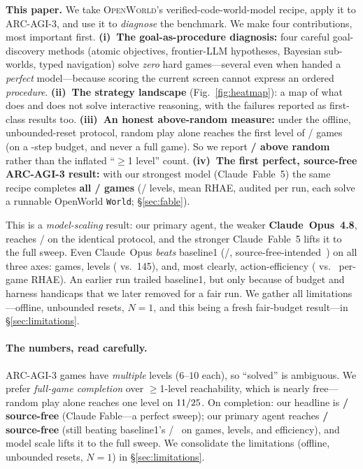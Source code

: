 \documentclass[11pt]{article}
\newcommand{\openworld}{\textsc{OpenWorld}}
\begin{document}
\textbf{This paper.} We take \openworld{}'s verified-code-world-model recipe, apply it to ARC-AGI-3, and
use it to \emph{diagnose} the benchmark. We make four contributions, most important first.
\textbf{(i)~The goal-as-procedure diagnosis:} four careful goal-discovery methods (atomic objectives,
frontier-LLM hypotheses, Bayesian sub-worlds, typed navigation) solve \emph{zero} hard games---several even
when handed a \emph{perfect} model---because scoring the current screen cannot express an ordered
\emph{procedure}. \textbf{(ii)~The strategy landscape} (Fig.~\ref{fig:heatmap}): a map of what does and
does not solve interactive reasoning, with the failures reported as first-class results too.
\textbf{(iii)~An honest above-random measure:} under the offline, unbounded-reset protocol, random play
alone reaches the first level of \ArcRandomGeqOne/\ArcUnionGames{} games (on a \ArcRandomBudget{}-step
budget, and never a full game). So we report \textbf{\ArcAboveRandom/\ArcUnionGames{} above random} rather
than the inflated ``$\geq$1 level'' count. \textbf{(iv)~The first perfect, source-free ARC-AGI-3 result:}
with our strongest model (Claude~Fable~5) the same recipe completes \textbf{all
\ArcFableFull/\ArcUnionGames{} games} (\ArcFableLevels/\ArcTotalLevels{} levels, \ArcFableRhae{} mean RHAE,
audited per run, each solve a runnable OpenWorld \texttt{World}; \S\ref{sec:fable}).

This is a \emph{model-scaling} result: our primary agent, the weaker \textbf{Claude~Opus~4.8}, reaches
\ArcSFGames/\ArcUnionGames{} on the identical protocol, and the stronger Claude~Fable~5 lifts it to the
full sweep. Even Claude~Opus \emph{beats} baseline1 (\ArcBaselineFull/\ArcUnionGames{},
source-free-intended~\cite{baseline1_ewm}) on all three axes:
games, levels (\ArcSFLevels{} vs.\ 145), and, most clearly, action-efficiency (\ArcRhaeSFGame{} vs.\
\ArcRhaeBaselineOne{} per-game RHAE). An earlier run trailed baseline1, but only because of budget and
harness handicaps that we later removed for a fair run. We gather all limitations---offline, unbounded
resets, $N{=}1$, and this being a fresh fair-budget result---in \S\ref{sec:limitations}.

\paragraph{The numbers, read carefully.} ARC-AGI-3 games have \emph{multiple} levels ($6$--$10$
each), so ``solved'' is ambiguous. We prefer \emph{full-game completion} over $\geq$1-level
reachability, which is nearly free---random play alone reaches one level on
$11/25$. On completion: our headline is \textbf{\ArcFableFull/\ArcUnionGames{}
source-free} (Claude Fable---a perfect sweep); our primary agent reaches
\textbf{\ArcSFGames/\ArcUnionGames{} source-free} (still beating baseline1's
\ArcBaselineFull/\ArcUnionGames{}~\cite{baseline1_ewm} on games, levels, and efficiency), and model scale
lifts it to the full sweep. We consolidate the limitations (offline,
unbounded resets, $N{=}1$) in \S\ref{sec:limitations}.
\end{document}
